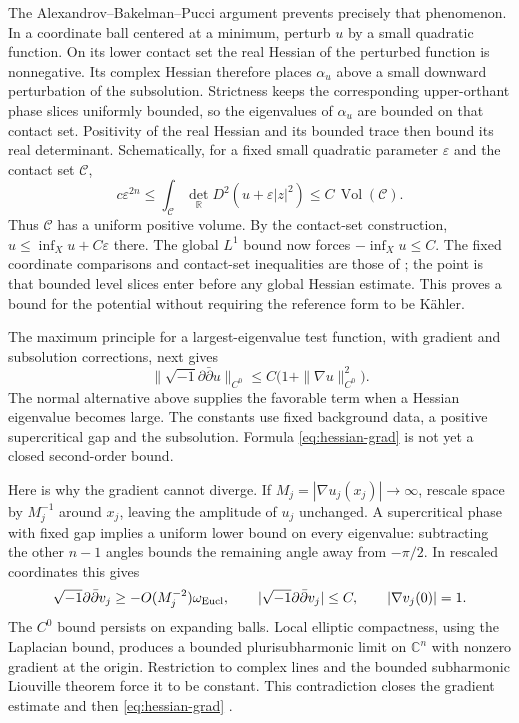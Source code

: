 \documentclass[12pt,reqno]{amsart}
\newcommand{\ii}{\sqrt{-1}}
\newcommand{\ddc}{\ii\partial\bar\partial}
\newcommand{\R}{\mathbb R}
\newcommand{\C}{\mathbb C}
\begin{document}
The Alexandrov--Bakelman--Pucci argument prevents precisely that phenomenon. In a coordinate ball centered at a minimum, perturb $u$ by a small quadratic function. On its lower contact set the real Hessian of the perturbed function is nonnegative. Its complex Hessian therefore places $\alpha_u$ above a small downward perturbation of the subsolution. Strictness keeps the corresponding upper-orthant phase slices uniformly bounded, so the eigenvalues of $\alpha_u$ are bounded on that contact set. Positivity of the real Hessian and its bounded trace then bound its real determinant. Schematically, for a fixed small quadratic parameter $\varepsilon$ and the contact set $\mathcal C$,
\[
 c\varepsilon^{2n}\leq
  \int_{\mathcal C}\det_{\R}D^2(u+\varepsilon|z|^2)
  \leq C\,\operatorname{Vol}(\mathcal C).
\]
Thus $\mathcal C$ has a uniform positive volume. By the contact-set construction, $u\leq\inf_Xu+C\varepsilon$ there. The global $L^1$ bound now forces $-\inf_Xu\leq C$. The fixed coordinate comparisons and contact-set inequalities are those of \cite[Proposition 3.6]{CJY}; the point is that bounded level slices enter before any global Hessian estimate. This proves a bound for the potential without requiring the reference form to be K\"ahler.

The maximum principle for a largest-eigenvalue test function, with gradient and subsolution corrections, next gives
\begin{equation}\label{eq:hessian-grad}
 \|\ddc u\|_{C^0}\leq C\bigl(1+\|\nabla u\|_{C^0}^2\bigr).
\end{equation}
The normal alternative above supplies the favorable term when a Hessian eigenvalue becomes large. The constants use fixed background data, a positive supercritical gap and the subsolution. Formula \eqref{eq:hessian-grad} is not yet a closed second-order bound.

Here is why the gradient cannot diverge. If $M_j=|\nabla u_j(x_j)|\to\infty$, rescale space by $M_j^{-1}$ around $x_j$, leaving the amplitude of $u_j$ unchanged. A supercritical phase with fixed gap implies a uniform lower bound on every eigenvalue: subtracting the other $n-1$ angles bounds the remaining angle away from $-\pi/2$. In rescaled coordinates this gives
\[
 \ddc v_j\geq-O(M_j^{-2})\omega_{\rm Eucl},\qquad
 |\ddc v_j|\leq C,
 \qquad |\nabla v_j(0)|=1.
\]
The $C^0$ bound persists on expanding balls. Local elliptic compactness, using the Laplacian bound, produces a bounded plurisubharmonic limit on $\C^n$ with nonzero gradient at the origin. Restriction to complex lines and the bounded subharmonic Liouville theorem force it to be constant. This contradiction closes the gradient estimate and then \eqref{eq:hessian-grad} \cite[Proposition 5.1]{CJY}.
\end{document}
